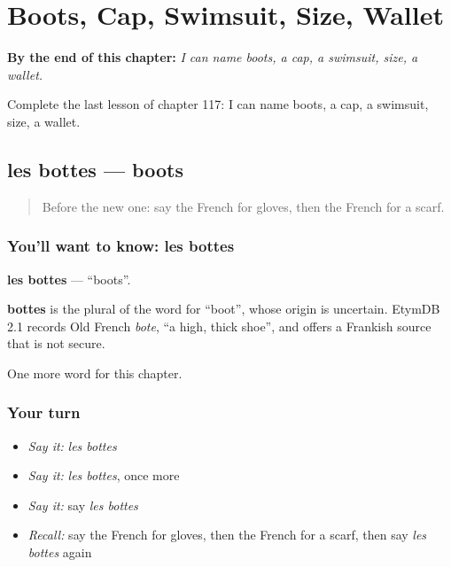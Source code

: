 
\chapter{Boots, Cap, Swimsuit, Size, Wallet}
\label{ch:fr-boots-cap-swimsuit-size-wallet}

\begin{chapteropening}
\textbf{By the end of this chapter:} \emph{I can name boots, a cap, a swimsuit, size, a wallet.}

Complete the last lesson of chapter 117: I can name boots, a cap, a swimsuit, size, a wallet.
\end{chapteropening}

\section[les bottes]{les bottes — boots}

\label{lesson:FR-C117-bottes}



\begin{quote}
Before the new one: say the French for gloves, then the French for a scarf.
\end{quote}

\subsection*{You'll want to know: les bottes}
\textbf{les bottes} — \textquotedblleft{}boots\textquotedblright{}.

\begin{cousinweb}
\textbf{bottes} is the plural of the word for \textquotedblleft{}boot\textquotedblright{}, whose origin is uncertain. EtymDB 2.1 records Old French \emph{bote}, \textquotedblleft{}a high, thick shoe\textquotedblright{}, and offers a Frankish source that is not secure.
\end{cousinweb}

\begin{grammarlens}[title={What you've built}]
One more word for this chapter.
\end{grammarlens}

\subsection*{Your turn}
\begin{itemize}
\raggedright
  \item \emph{Say it:} \emph{les bottes}
  \item \emph{Say it:} \emph{les bottes}, once more
  \item \emph{Say it:} say \emph{les bottes}
  \item \emph{Recall:} say the French for gloves, then the French for a scarf, then say \emph{les bottes} again
\end{itemize}

